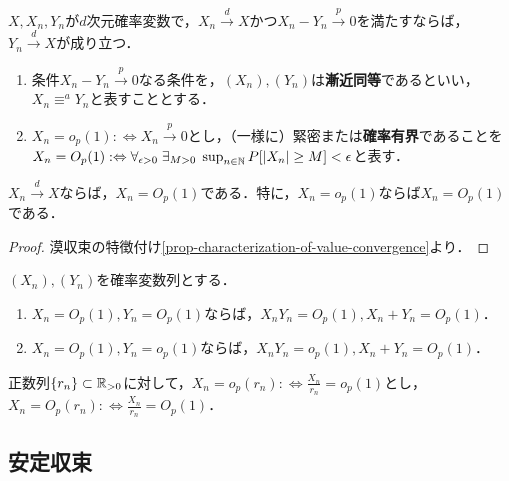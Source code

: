 \documentclass[uplatex,dvipdfmx]{jsreport}
\begin{document}
\begin{corollary}
    $X,X_n,Y_n$が$d$次元確率変数で，$X_n\xrightarrow{d}X$かつ$X_n-Y_n\xrightarrow{p}0$を満たすならば，$Y_n\xrightarrow{d}X$が成り立つ．
\end{corollary}

\begin{definition}\mbox{}
    \begin{enumerate}
        \item 条件$X_n-Y_n\xrightarrow{p}0$なる条件を，$(X_n),(Y_n)$は\textbf{漸近同等}であるといい，$X_n\equiv^aY_n$と表すこととする．
        \item $X_n=o_p(1):\Leftrightarrow X_n\xrightarrow{p}0$とし，（一様に）緊密または\textbf{確率有界}であることを$X_n=O_p(1):\Leftrightarrow\forall_{\epsilon>0}\;\exists_{M>0}\;\sup_{n\in\mathbb{N}}P[\lvert X_n\rvert\ge M]<\epsilon$と表す．
    \end{enumerate}
\end{definition}

\begin{lemma}
    $X_n\xrightarrow{d}X$ならば，$X_n=O_p(1)$である．特に，$X_n=o_p(1)$ならば$X_n=O_p(1)$である．
\end{lemma}
\begin{proof}
    漠収束の特徴付け\ref{prop-characterization-of-value-convergence}より．
\end{proof}

\begin{lemma}
    $(X_n),(Y_n)$を確率変数列とする．
    \begin{enumerate}
        \item $X_n=O_p(1),Y_n=O_p(1)$ならば，$X_nY_n=O_p(1),X_n+Y_n=O_p(1)$．
        \item $X_n=O_p(1),Y_n=o_p(1)$ならば，$X_nY_n=o_p(1),X_n+Y_n=O_p(1)$．
    \end{enumerate}
\end{lemma}

\begin{definition}
    正数列$\{r_n\}\subset\mathbb{R}_{>0}$に対して，$X_n=o_p(r_n):\Leftrightarrow\frac{X_n}{r_n}=o_p(1)$とし，$X_n=O_p(r_n):\Leftrightarrow\frac{X_n}{r_n}=O_p(1)$．
\end{definition}

\subsection{安定収束}
\end{document}
